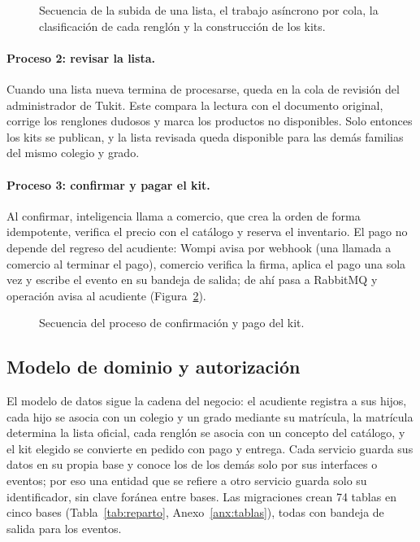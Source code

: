 \begin{figure}[!htb]
\centering
\resizebox{0.78\textwidth}{!}{}
\caption{Secuencia de la subida de una lista, el trabajo asíncrono por cola, la clasificación de cada renglón y la construcción de los kits.}
\label{fig:sec-pipeline}
\end{figure}

\paragraph{Proceso 2: revisar la lista.} Cuando una lista nueva termina de procesarse, queda en la cola de revisión del administrador de Tukit. Este compara la lectura con el documento original, corrige los renglones dudosos y marca los productos no disponibles. Solo entonces los kits se publican, y la lista revisada queda disponible para las demás familias del mismo colegio y grado.


\paragraph{Proceso 3: confirmar y pagar el kit.} Al confirmar, inteligencia llama a comercio, que crea la orden de forma idempotente, verifica el precio con el catálogo y reserva el inventario. El pago no depende del regreso del acudiente: Wompi avisa por webhook (una llamada a comercio al terminar el pago), comercio verifica la firma, aplica el pago una sola vez y escribe el evento en su bandeja de salida; de ahí pasa a RabbitMQ y operación avisa al acudiente (Figura~\ref{fig:sec-pago}).

\begin{figure}[!htb]
\centering
\resizebox{0.78\textwidth}{!}{}
\caption{Secuencia del proceso de confirmación y pago del kit.}
\label{fig:sec-pago}
\end{figure}

\subsection{Modelo de dominio y autorización}
\label{sec:dominio}
\label{sec:autorizacion}
\label{sec:datos}
\label{sec:modelo-datos}

El modelo de datos sigue la cadena del negocio: el acudiente registra a sus hijos, cada hijo se asocia con un colegio y un grado mediante su matrícula, la matrícula determina la lista oficial, cada renglón se asocia con un concepto del catálogo, y el kit elegido se convierte en pedido con pago y entrega. Cada servicio guarda sus datos en su propia base y conoce los de los demás solo por sus interfaces o eventos; por eso una entidad que se refiere a otro servicio guarda solo su identificador, sin clave foránea entre bases. Las migraciones crean 74 tablas en cinco bases (Tabla~\ref{tab:reparto}, Anexo~\ref{anx:tablas}), todas con bandeja de salida para los eventos.

